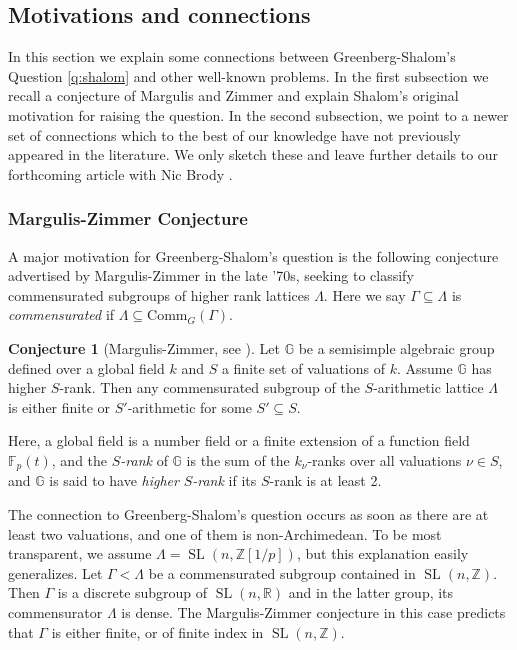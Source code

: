\documentclass[JEP,XML,SOM,Unicode,published]{cedram}
\newcommand{\G}{\ensuremath{\mathbb{G}}}
\newcommand{\bbF}{\ensuremath{\mathbb{F}}}
\newcommand{\bbR}{\ensuremath{\mathbb{R}}}
\newcommand{\bbZ}{\ensuremath{\mathbb{Z}}}
\DeclareMathOperator{\SL}{SL}
\theoremstyle{definition}
\newtheorem{conj}[thm]{Conjecture}
\begin{document}
\subsection{Motivations and connections}
\label{sec:connect}

In this section we explain some connections between Greenberg-Shalom's Question \ref{q:shalom} and other well-known problems. In the first subsection we recall a conjecture of Margulis and Zimmer and explain Shalom's original motivation for raising the question. In the second subsection, we point to a newer set of connections which to the best of our knowledge have not previously appeared in the literature. We only sketch these and leave further details to our forthcoming article with Nic Brody \cite{BFMVL}.

\subsubsection{Margulis-Zimmer Conjecture}
\label{subsec:mz}

A major motivation for Greenberg-Shalom's question is the following conjecture advertised by Margulis-Zimmer in the late '70s, seeking to classify commensurated subgroups of higher rank lattices $\Lambda$. Here we say $\Gamma\subseteq\Lambda$ is \emph{commensurated} if $\Lambda\subseteq \text{Comm}_G(\Gamma)$.

\begin{conj}[{Margulis-Zimmer, see \cite{shalom-willis}}] \label{conj:mz}
Let $\G$ be a semisimple algebraic group defined over a global field $k$ and $S$ a finite set of valuations of $k$. Assume $\G$ has higher $S$-rank. Then any commensurated subgroup of the $S$-arithmetic lattice $\Lambda$ is either finite or $S'$-arithmetic for some $S'\subseteq S$.
\end{conj}

Here, a global field is a number field or a finite extension of a function field $\bbF_p(t)$, and the $S$\emph{-rank} of $\G$ is the sum of the $k_{\nu}$-ranks over all valuations $\nu\in S$, and $\G$ is said to have \emph{higher }$S$\emph{-rank} if its $S$-rank is at least 2.

The connection to Greenberg-Shalom's question occurs as soon as there are at least two valuations, and one of them is non-Archimedean.
To be most transparent, we assume $\Lambda = \SL(n, \bbZ[1/p])$, but this explanation easily generalizes. Let $\Gamma < \Lambda$ be a commensurated subgroup contained in $\SL(n, \bbZ)$.
Then $\Gamma$ is a discrete subgroup of $\SL(n,\bbR)$ and in the latter group, its commensurator $\Lambda$ is dense. The Margulis-Zimmer conjecture in this case predicts that $\Gamma$ is either finite, or of finite index in $\SL(n,\mathbb{Z})$.
\end{document}
